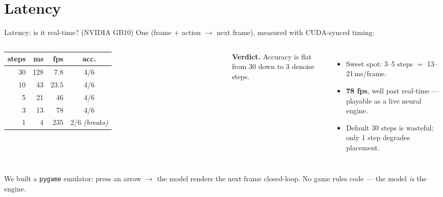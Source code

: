 \documentclass[aspectratio=169,11pt]{beamer}
\newcommand{\code}[1]{\texttt{\small #1}}
\begin{document}
\section{Latency}
\begin{frame}{Latency: is it real-time? (NVIDIA GB10)}
  One (frame $+$ action $\to$ next frame), measured with CUDA-synced timing:
  \vspace{0.3em}
  \begin{columns}[T]
    \centering\small
    \begin{tabular}{@{}rrrc@{}}
      \toprule
      \textbf{steps} & \textbf{ms} & \textbf{fps} & \textbf{acc.} \\
      \midrule
      30 & 128 & 7.8  & 4/6 \\
      10 & 43  & 23.5 & 4/6 \\
      \alert{5}  & \alert{21}  & \alert{46}   & \alert{4/6} \\
      \alert{3}  & \alert{13}  & \alert{78}   & \alert{4/6} \\
      1  & 4   & 235  & 2/6 \emph{(breaks)} \\
      \bottomrule
    \end{tabular}
      \textbf{Verdict.} Accuracy is \alert{flat from 30 down to 3} denoise steps.
      \vspace{0.5em}
      \begin{itemize}
        \item Sweet spot: \alert{3--5 steps} $=$ \alert{13--21\,ms/frame}.
        \item \textbf{78 fps}, well past real-time --- playable as a live neural engine.
        \item Default 30 steps is wasteful; only 1 step degrades placement.
      \end{itemize}
  \end{columns}
  \vspace{0.4em}
  \footnotesize We built a \code{pygame} emulator: press an arrow $\to$ the model
  renders the next frame closed-loop. No game rules code --- the model \emph{is} the engine.
\end{frame}

\end{document}
